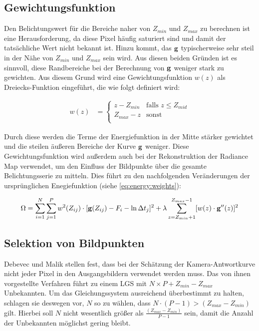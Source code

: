 \subsection{Gewichtungsfunktion}
\label{algo:schwachstellen:gewichtung}
Den Belichtungswert für die Bereiche naher von $Z_{min}$ und $Z_{max}$ zu berechnen ist eine Herausforderung, da diese Pixel häufig saturiert sind und damit der tatsächliche Wert nicht bekannt ist. Hinzu kommt, das $\mathbf g$ typischerweise sehr steil in der Nähe von $Z_{min}$ und $Z_{max}$ sein wird. Aus diesen beiden Gründen ist es sinnvoll, diese Randbereiche bei der Berechnung von $\mathbf g$ weniger stark zu gewichten. Aus diesem Grund wird eine Gewichtungsfunktion $w(z)$ als Dreiecks-Funktion eingeführt, die wie folgt definiert wird: 

\begin{align}
\label{eq:w}
w(z) &= \begin{cases} 
z - Z_{min}&  \text{falls } z \leq Z_{mid}  \\ 
Z_{max}-z& \text{sonst}\\
\end{cases}
\end{align}

Durch diese werden die Terme der Energiefunktion in der Mitte stärker gewichtet und die steilen äußeren Bereiche der Kurve $\mathbf g$ weniger. Diese Gewichtungsfunktion wird außerdem auch bei der Rekonstruktion der \gls{Radiance Map} verwendet, um den Einfluss der Bildpunkte über die gesamte Belichtungsserie zu mitteln. Dies führt zu den nachfolgenden Veränderungen der ursprünglichen Enegiefunktion (siehe \autoref{eq:energy:weights}):

\begin{equation}
\label{eq:energy:weights}
\Omega = \sum \limits_{i=1}^{N} \sum \limits_{j=1}^{P}w^2(Z_{ij})\cdot[\mathbf g(Z_{ij}) - F_i - \ln \Delta t_j]^2 + \lambda  \sum \limits_{z=Z_{min}+1}^{Z_{max}-1} [w(z) \cdot \mathbf{g}''(z)]^2\\
\end{equation}

\subsection{Selektion von Bildpunkten}
\label{algo:schwachstellen:selektion}
Debevec und Malik stellen fest, dass bei der Schätzung der Kamera-Antwortkurve nicht jeder Pixel in den Ausgangsbildern verwendet werden muss. Das von ihnen vorgestellte Verfahren führt zu einem \gls{LGS} mit $N \times P + Z_{min} - Z_{max}$ Unbekannten. Um das Gleichungssystem ausreichend überbestimmt zu halten, schlagen sie deswegen vor, $N$ so zu wählen, dass $N\cdot(P-1) > (Z_{max} -Z_{min})$ gilt. Hierbei soll $N$ nicht wesentlich größer als $\frac{(Z_{max} -Z_{min})}{P-1}$ sein, damit die Anzahl der Unbekannten möglichst gering bleibt. 

